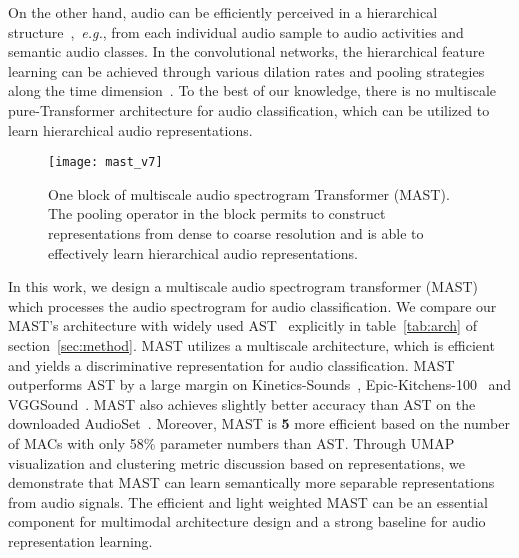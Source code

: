 \documentclass{article}
\def\eg{\emph{e.g.}}
\begin{document}
On the other hand, audio can be efficiently perceived in a hierarchical structure~\cite{dieleman2013multiscale,snyder2018x},~\eg, from each individual audio sample to audio activities and semantic audio classes. In the convolutional networks, the hierarchical feature learning can be achieved through various dilation rates and pooling strategies along the time dimension~\cite{snyder2018x}. To the best of our knowledge, there is no multiscale pure-Transformer architecture for audio classification, which can be utilized to learn hierarchical audio representations. 

\begin{figure}
	\centering  \texttt{[image: mast\_v7]}
	\caption{One block of multiscale audio spectrogram Transformer (MAST). The pooling operator in the block permits to construct representations from dense to coarse resolution and is able to effectively learn hierarchical audio representations.}  \label{fig:audio_framework}
\end{figure}

In this work, we design a multiscale audio spectrogram transformer (MAST) which processes the audio spectrogram for audio classification. We compare our MAST's architecture with widely used AST~\cite{gong2021ast} explicitly in table~\ref{tab:arch} of section~\ref{sec:method}. MAST utilizes a multiscale architecture, which is efficient and yields a discriminative representation for audio classification. MAST outperforms AST by a large margin on Kinetics-Sounds~\cite{arandjelovic2017look,kay2017kinetics}, Epic-Kitchens-100~\cite{Damen2021RESCALING,Damen2018EPICKITCHENS,Damen2021PAMI} and VGGSound~\cite{chen2020vggsound}. MAST also achieves slightly better accuracy than AST on the downloaded AudioSet~\cite{gemmeke2017audio}. Moreover, MAST is \textbf{5} more efficient based on the number of MACs with only 58\% parameter numbers than AST. Through UMAP~\cite{mcinnes2018umap} visualization and clustering metric discussion based on representations, we demonstrate that MAST can learn semantically more separable representations from audio signals. The efficient and light weighted MAST can be an essential component for multimodal architecture design and a strong baseline for audio representation learning.
\end{document}
